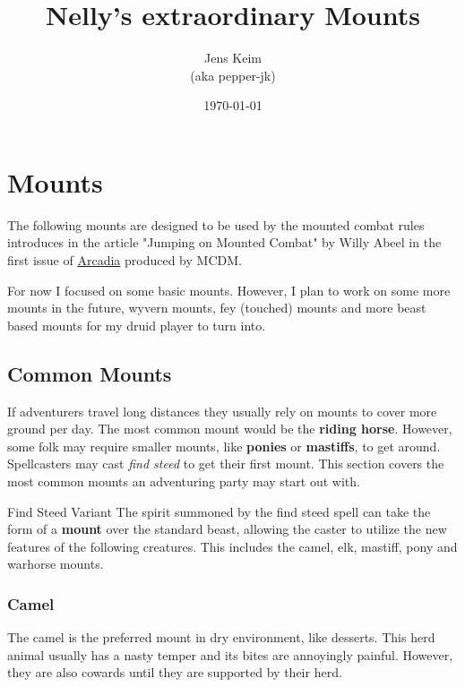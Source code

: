 \documentclass[letterpaper,twocolumn,openany,nodeprecatedcode]{dndbook}
\title{Nelly's extraordinary Mounts}
\author{Jens Keim\\(aka pepper-jk)}
\date{\today}
\begin{document}
\frontmatter

\maketitle

\tableofcontents

\mainmatter

\chapter{Mounts}

The following mounts are designed to be used by the mounted combat rules introduces in the article "Jumping on Mounted Combat" by Willy Abeel in the first issue of \href{https://www.youtube.com/watch?v=oid4QMMXjfs}{Arcadia} produced by MCDM.

For now I focused on some basic mounts. However, I plan to work on some more mounts in the future, wyvern mounts, fey (touched) mounts and more beast based mounts for my druid player to turn into.

\section{Common Mounts}

If adventurers travel long distances they usually rely on mounts to cover more ground per day.
The most common mount would be the \textbf{riding horse}.
However, some folk may require smaller mounts, like \textbf{ponies} or \textbf{mastiffs}, to get around.
Spellcasters may cast \textit{find steed} to get their first mount.
This section covers the most common mounts an adventuring party may start out with.

\begin{DndComment}{Find Steed Variant}
    The spirit summoned by the find steed spell can take the form of a \textbf{mount} over the standard beast, allowing the caster to utilize the new features of the following creatures. This includes the camel, elk, mastiff, pony and warhorse mounts.
\end{DndComment}

\subsection{Camel}
The camel is the preferred mount in dry environment, like desserts.
This herd animal usually has a nasty temper and its bites are annoyingly painful.
However, they are also cowards until they are supported by their herd.
\end{document}
